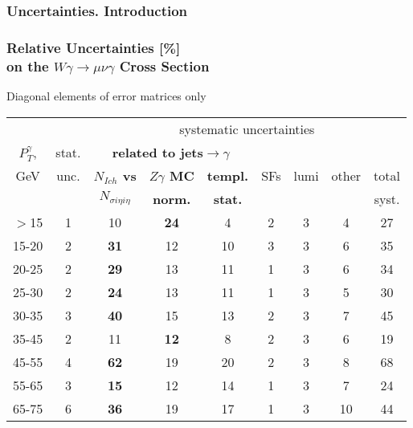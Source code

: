 \begin{frame}\frametitle{Uncertainties. Introduction}

\end{frame}%

\begin{frame}\frametitle{Relative Uncertainties [\%]\\ 
          on the $W\gamma\rightarrow\mu\nu\gamma$ Cross Section}
\footnotesize
Diagonal elements of error matrices only
\begin{table}[h]
  \tiny
  \begin{center}
   \begin{tabular}{|c|c|c|c|c|c|c|c|c|}
    \hline
                   &     & \multicolumn{7}{|c|}{systematic uncertainties}     \\
    $P_T^{\gamma}$,  & stat. & \multicolumn{3}{|c|}{\color{blue}\bfseries{related to jets$\rightarrow\gamma$}} &  &  &  & \\
    GeV           & unc. & {\color{blue}\bfseries{$N_{Ich}$ vs}} &{\color{blue}\bfseries{$Z\gamma$ MC}}      &{\color{blue}\bfseries{templ.}} & SFs & lumi & other & total\\ 
                  &     & {\color{blue}\bfseries{$N_{\sigma{i\eta i\eta}}$}} & {\color{blue}\bfseries{norm.}}    & {\color{blue}\bfseries{stat.}}  &  &  &  & syst.\\ \hline
    $>$15  & 1 & 10 & {\color{blue}\bfseries{24}} & 4 & 2 & 3 & 4 & 27 \\ \hline
    15-20 & 2 & {\color{blue}\bfseries{31}} & 12 & 10 & 3 & 3 & 6 & 35 \\ \hline
    20-25 & 2 & {\color{blue}\bfseries{29}} & 13 & 11 & 1 & 3 & 6 & 34 \\ \hline
    25-30 & 2 & {\color{blue}\bfseries{24}} & 13 & 11 & 1 & 3 & 5 & 30 \\ \hline
    30-35 & 3 & {\color{blue}\bfseries{40}} & 15 & 13 & 2 & 3 & 7 & 45 \\ \hline
    35-45 & 2 & 11 & {\color{blue}\bfseries{12}} & 8 & 2 & 3 & 6 & 19 \\ \hline
    45-55 & 4 & {\color{blue}\bfseries{62}} & 19 & 20 & 2 & 3 & 8 & 68 \\ \hline
    55-65 & 3 & {\color{blue}\bfseries{15}} & 12 & 14 & 1 & 3 & 7 & 24 \\ \hline
    65-75 & 6 & {\color{blue}\bfseries{36}} & 19 & 17 & 1 & 3 & 10 & 44 \\ \hline

\end{tabular}
\end{center}
\end{table}
\end{frame}
